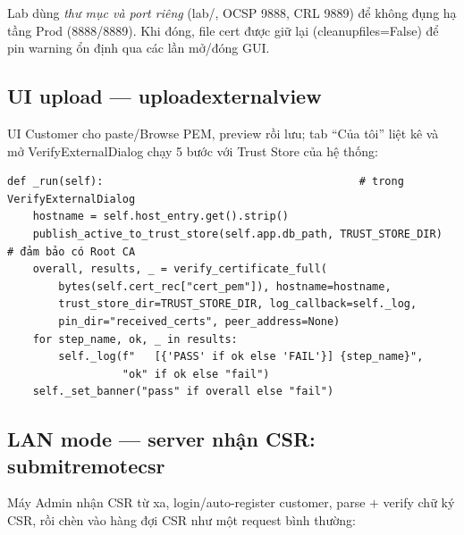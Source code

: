 \documentclass[12pt,a4paper]{article}
\newcommand{\code}[1]{{\ttfamily\small\def\_{\textunderscore\discretionary{}{}{}}#1}}
\begin{document}
Lab dùng \emph{thư mục và port riêng} (\code{lab/}, OCSP 9888, CRL 9889) để không
đụng hạ tầng Prod (8888/8889). Khi đóng, file cert được giữ lại (\code{cleanup\_files=False})
để pin warning ổn định qua các lần mở/đóng GUI.

\subsection{UI upload --- \code{upload\_external\_view}}

UI Customer cho paste/Browse PEM, preview rồi lưu; tab ``Của tôi'' liệt kê và mở
\code{VerifyExternalDialog} chạy 5 bước với Trust Store của hệ thống:

\begin{Verbatim}
def _run(self):                                        # trong VerifyExternalDialog
    hostname = self.host_entry.get().strip()
    publish_active_to_trust_store(self.app.db_path, TRUST_STORE_DIR)  # đảm bảo có Root CA
    overall, results, _ = verify_certificate_full(
        bytes(self.cert_rec["cert_pem"]), hostname=hostname,
        trust_store_dir=TRUST_STORE_DIR, log_callback=self._log,
        pin_dir="received_certs", peer_address=None)
    for step_name, ok, _ in results:
        self._log(f"   [{'PASS' if ok else 'FAIL'}] {step_name}",
                  "ok" if ok else "fail")
    self._set_banner("pass" if overall else "fail")
\end{Verbatim}

\subsection{LAN mode --- server nhận CSR: \code{submit\_remote\_csr}}

Máy Admin nhận CSR từ xa, login/auto-register customer, parse $+$ verify chữ ký
CSR, rồi chèn vào hàng đợi CSR như một request bình thường:
\end{document}
